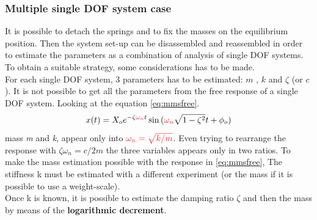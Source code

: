 \documentclass[twosided,a4paper]{article}           %
\begin{document}
\subsubsection{Multiple single DOF system case}
It is possible to detach the springs and to fix the masses on the equilibrium position. Then the system set-up can be disassembled and reassembled in order to estimate the parameters as a combination of analysis of single DOF systems. To obtain a suitable strategy, some considerations has to be made.\\ For each single DOF system, 3 parameters has to be estimated: $m$ , $k$ and $\zeta$ (or $c$). It is not possible to get all the parameters from the free response of a single DOF system. Looking at the equation \eqref{eq:mmsfree}.
\begin{equation}
\label{eq:mmsfree}
	x(t) = X_o e^{-\zeta \textcolor{Red}{\omega_n} t} \sin{(\textcolor{Red}{\omega_n}\sqrt{1-\zeta^2} t + \phi_o)}
\end{equation} 
mass \textit{m} and \textit{k}, appear only into $\textcolor{Red}{\omega_n = \sqrt{k/m}}$.
Even trying to rearrange the response with $\zeta \omega_n = c/2m$ the three variables appears only in two ratios.
To make the mass estimation possible with the response in \eqref{eq:mmsfree}, The stiffness k must be estimated with a different experiment (or the mass if it is possible to use a weight-scale).\\
Once k is known, it is possible to estimate the damping ratio $\zeta$ and then the mass by means of the \textbf{logarithmic decrement}.
\end{document}
